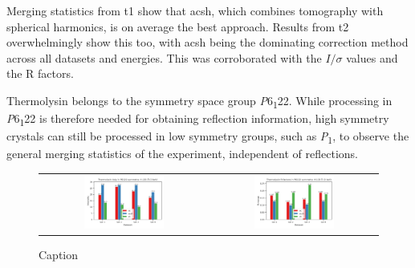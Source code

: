 Merging statistics from \ac{t1} show that \ac{acsh}, which combines tomography with spherical harmonics, is on average the best approach. 
Results from \ac{t2} overwhelmingly show this too, with \ac{acsh} being the dominating correction method across all datasets and energies. This was corroborated with the $I/\sigma$ values and the R factors.


Thermolysin belongs to the symmetry space group \textit{P}6\textsubscript{1}22. While processing in \textit{P}6\textsubscript{1}22 is therefore needed for obtaining reflection information, high symmetry crystals can still be processed in low symmetry groups, such as \textit{P}\textsubscript{1}, to observe the general merging statistics of the experiment, independent of reflections.

\begin{figure}[h]
    \centering
    \begin{tabular}{cc}
    \includegraphics[width = 0.5\textwidth]{plots/exp1/tlys_2_P6122/3p0_I_over_sigma.png} & \includegraphics[width = 0.5\textwidth]{plots/exp1/tlys_2_P6122/3p0_rmerges.png}
    \end{tabular}
    \caption{Caption}
    \label{fig:tlys_2_p6}
\end{figure}

